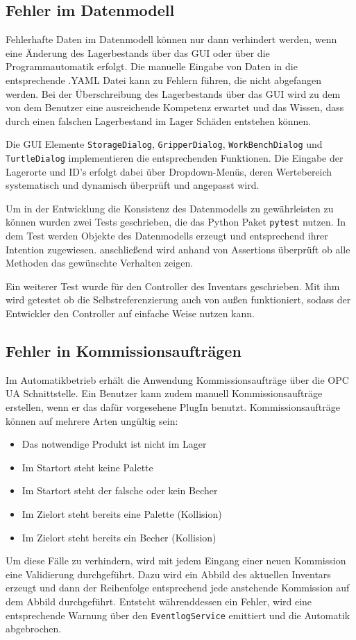 \subsection{Fehler im Datenmodell}

Fehlerhafte Daten im Datenmodell können nur dann verhindert werden, wenn eine Änderung des Lagerbestands über das GUI oder über die 
Programmautomatik erfolgt.
Die manuelle Eingabe von Daten in die entsprechende .YAML Datei kann zu Fehlern führen, die nicht abgefangen werden.
Bei der Überschreibung des Lagerbestands über das GUI wird zu dem von dem Benutzer eine ausreichende Kompetenz erwartet und das Wissen, 
dass durch einen falschen Lagerbestand im Lager Schäden entstehen können. 

Die GUI Elemente \verb|StorageDialog|, \verb|GripperDialog|, \verb|WorkBenchDialog| und \\ \verb|TurtleDialog| implementieren 
die entsprechenden Funktionen.
Die Eingabe der Lagerorte und ID's erfolgt dabei über Dropdown-Menüs, deren Wertebereich systematisch und dynamisch überprüft und 
angepasst wird. 

Um in der Entwicklung die Konsistenz des Datenmodells zu gewährleisten zu können wurden zwei Tests geschrieben, die das Python Paket 
\verb|pytest| nutzen. In dem Test werden Objekte des Datenmodells erzeugt und entsprechend ihrer Intention zugewiesen. 
anschließend wird anhand von Assertions überprüft ob alle Methoden das gewünschte Verhalten zeigen. 

Ein weiterer Test wurde für den Controller des Inventars geschrieben. Mit ihm wird getestet ob die Selbstreferenzierung auch von außen funktioniert, 
sodass der Entwickler den Controller auf einfache Weise nutzen kann. 

\subsection{Fehler in Kommissionsaufträgen}

Im Automatikbetrieb erhält die Anwendung Kommissionsaufträge über die OPC UA Schnittstelle.
Ein Benutzer kann zudem manuell Kommissionsaufträge erstellen, wenn er das dafür vorgesehene PlugIn benutzt.
Kommissionsaufträge können auf mehrere Arten ungültig sein: 
\begin{itemize}
    \item Das notwendige Produkt ist nicht im Lager
    \item Im Startort steht keine Palette
    \item Im Startort steht der falsche oder kein Becher
    \item Im Zielort steht bereits eine Palette (Kollision)
    \item Im Zielort steht bereits ein Becher (Kollision)
\end{itemize}
Um diese Fälle zu verhindern, wird mit jedem Eingang einer neuen Kommission eine Validierung durchgeführt.
Dazu wird ein Abbild des aktuellen Inventars erzeugt und dann der Reihenfolge entsprechend jede anstehende Kommission auf dem Abbild durchgeführt. 
Entsteht währenddessen ein Fehler, wird eine entsprechende Warnung über den \verb|EventlogService| emittiert und die 
Automatik abgebrochen.